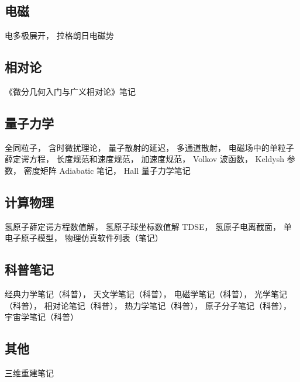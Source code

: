 \subsection{电磁}
电多极展开， 拉格朗日电磁势

\subsection{相对论}
《微分几何入门与广义相对论》笔记

\subsection{量子力学}
全同粒子， 含时微扰理论， 量子散射的延迟， 多通道散射， 电磁场中的单粒子薛定谔方程， 长度规范和速度规范， 加速度规范， Volkov 波函数， Keldysh 参数， 密度矩阵
Adiabatic 笔记，
Hall 量子力学笔记

\subsection{计算物理}
氢原子薛定谔方程数值解， 氢原子球坐标数值解 TDSE， 氢原子电离截面，  单电子原子模型， 物理仿真软件列表（笔记）

\subsection{科普笔记}
经典力学笔记（科普），
天文学笔记（科普），
电磁学笔记（科普），
光学笔记（科普），
相对论笔记（科普），
热力学笔记（科普），
原子分子笔记（科普），
宇宙学笔记（科普）

\subsection{其他}
三维重建笔记
